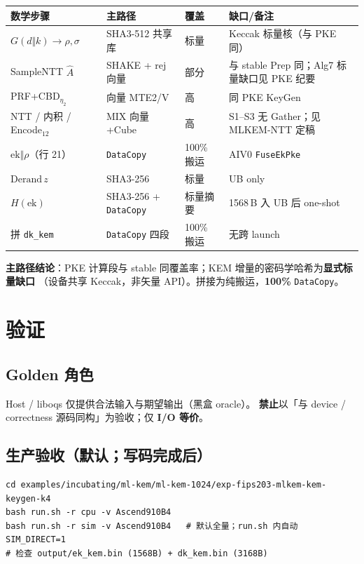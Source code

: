 \documentclass[UTF8,a4paper,11pt]{ctexart}
\begin{document}
\begin{longtable}{@{}L{3.8cm}L{3.6cm}L{1.4cm}L{4.0cm}@{}}
\toprule
数学步骤 & 主路径 & 覆盖 & 缺口/备注 \\
\midrule
$G(d\Vert k)\to\rho,\sigma$ & SHA3-512 共享库 & 标量 & Keccak 标量核（与 PKE 同） \\
SampleNTT $\hat{A}$ & SHAKE + rej 向量 & 部分 & 与 stable Prep 同；Alg7 标量缺口见 PKE 纪要 \\
PRF+CBD$_{\eta_2}$ & 向量 MTE2/V & 高 & 同 PKE KeyGen \\
NTT / 内积 / Encode$_{12}$ & MIX 向量+Cube & 高 & S1--S3 无 Gather；见 MLKEM-NTT 定稿 \\
$\mathrm{ek}\Vert\rho$（行 21） & \texttt{DataCopy} & 100\% 搬运 & AIV0 \texttt{FuseEkPke} \\
$\mathrm{Derand}\,z$ & SHA3-256 & 标量 & UB only \\
$H(\mathrm{ek})$ & SHA3-256 + \texttt{DataCopy} & 标量摘要 & 1568\,B 入 UB 后 one-shot \\
拼 \texttt{dk\_kem} & \texttt{DataCopy} 四段 & 100\% 搬运 & 无跨 launch \\
\bottomrule
\end{longtable}

\textbf{主路径结论}：PKE 计算段与 stable 同覆盖率；KEM 增量的密码学哈希为\textbf{显式标量缺口}
（设备共享 Keccak，非矢量 API）。拼接为纯搬运，\textbf{100\%} \texttt{DataCopy}。

\section{验证}
\label{sec:verify}

\subsection{Golden 角色}

Host / liboqs 仅提供合法输入与期望输出（黑盒 oracle）。
\textbf{禁止}以「与 device / correctness 源码同构」为验收；仅 \textbf{I/O 等价}。

\subsection{生产验收（默认；写码完成后）}

\begin{verbatim}
cd examples/incubating/ml-kem/ml-kem-1024/exp-fips203-mlkem-kem-keygen-k4
bash run.sh -r cpu -v Ascend910B4
bash run.sh -r sim -v Ascend910B4   # 默认全量；run.sh 内自动 SIM_DIRECT=1
# 检查 output/ek_kem.bin (1568B) + dk_kem.bin (3168B)
\end{verbatim}
\end{document}
